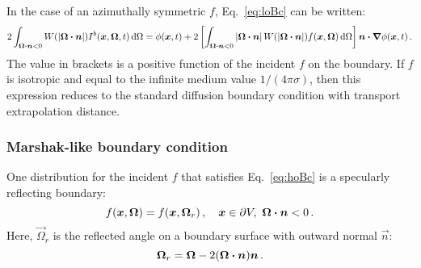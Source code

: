 In the case of an azimuthally symmetric $f$, Eq.~\eqref{eq:loBc} can be written:
\begin{equation} \label{eq:loBc2}
2\int_{\bm{\Omega}\bm{\cdot}\bm{n} < 0} W(\left| \bm{\Omega}\bm{\cdot}\bm{n} \right|)
I^b(\bm{x},\bm{\Omega},t) \mathop{}\!\mathrm{d}\Omega
=
\phi(\bm{x},t)
+ 2 \left[ \int_{\bm{\Omega}\bm{\cdot}\bm{n} < 0}
\left| \bm{\Omega}\bm{\cdot}\bm{n} \right| W(\left| \bm{\Omega}\bm{\cdot}\bm{n} \right|)
f(\bm{x}, \bm{\Omega}) \mathop{}\!\mathrm{d}\Omega\right]
\bm{n} \bm{\cdot} \bm{\nabla} \phi(\bm{x},t)\,.
\end{equation}
The value in brackets is a positive function of the incident $f$ on the
boundary. If $f$ is isotropic and equal to the infinite medium value
$1/(4\pi\sigma)$, then this expression reduces to the standard diffusion
boundary condition with transport extrapolation distance.


\subsubsection{Marshak-like boundary condition}

One distribution for the incident $f$ that satisfies
Eq.~\eqref{eq:hoBc} is a specularly reflecting boundary:
\begin{equation} \label{eq:zetaReflecting}
  f(\bm{x}, \bm{\Omega}) = f(\bm{x}, \bm{\Omega}_r) \,,
 \quad \bm{x} \in \partial V, \ \bm{\Omega} \bm{\cdot} \bm{n} < 0 \,.
\end{equation}
Here, $\vec{\Omega}_r$ is the reflected angle on a boundary surface with outward
normal $\vec{n}$:
\begin{equation} \label{eq:reflection}
  \bm{\Omega}_r = \bm{\Omega} - 2(\bm{\Omega} \bm{\cdot} \bm{n}) \bm{n}\,.
\end{equation}

